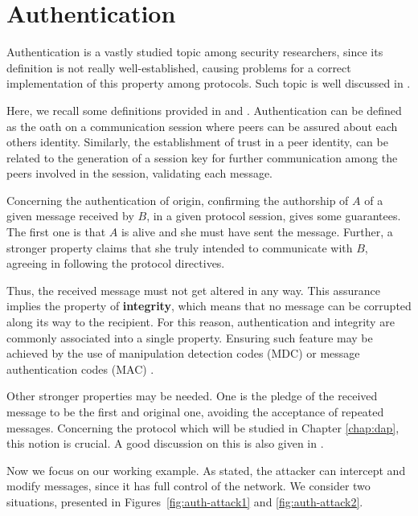 \section{Authentication}
\label{sec:protocols:auth}
Authentication is a vastly studied topic among security researchers, since its definition is not really well-established, causing problems for a correct implementation of this property among protocols. Such topic is well discussed in \cite{gollmann-authentication}.

Here, we recall some definitions provided in \cite{diffie-authentication} and \cite{ryan-schneider}. Authentication can be defined as the oath on a communication session where peers can be assured about each others identity. Similarly, the establishment of trust in a peer identity, can be related to the generation of a session key for further communication among the peers involved in the session, validating each message.

Concerning the authentication of origin, confirming the authorship of $A$ of a given message received by $B$, in a given protocol session, gives some guarantees. The first one is that $A$ is alive and she must have sent the message. Further, a stronger property claims that she truly intended to communicate with $B$, agreeing in following the protocol directives.

Thus, the received message must not get altered in any way. This assurance implies the property of \textbf{integrity}, which means that no message can be corrupted along its way to the recipient. For this reason, authentication and integrity are commonly associated into a single property. Ensuring such feature may be achieved by the use of manipulation detection codes (MDC) or message authentication codes (MAC) \cite{ross-security}.

Other stronger properties may be needed. One is the pledge of the received message to be the first and original one, avoiding the acceptance of repeated messages. Concerning the protocol which will be studied in Chapter \ref{chap:dap}, this notion is crucial. A good discussion on this is also given in \cite{gollmann-authentication}.

Now we focus on our working example. As stated, the attacker can intercept and modify messages, since it has full control of the network. We consider two situations, presented in Figures~\ref{fig:auth-attack1} and \ref{fig:auth-attack2}.

